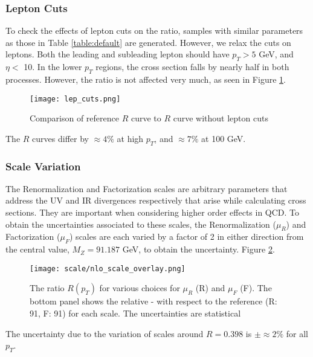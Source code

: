 \documentclass[11pt,a4paper,final]{report}
\begin{document}
\subsubsection{Lepton Cuts}
To check the effects of lepton cuts on the ratio, samples with similar parameters as those in Table \ref{table:default} are generated. However, we relax the cuts on leptons. Both the leading and subleading lepton should have $p_T > 5$ GeV, and $\eta <$ 10. In the lower $p_T$ regions, the cross section falls by nearly half in both processes. However, the ratio is not affected very much, as seen in Figure \ref{fig:lepcut}.
\begin{figure}[H]
\centering
	\texttt{[image: lep\_cuts.png]}
	\caption{Comparison of reference $R$ curve to $R$ curve without lepton cuts}
	\label{fig:lepcut}
\end{figure}
The $R$ curves differ by $\approx 4\%$ at high $p_T$, and $\approx 7\%$ at 100 GeV.

\subsubsection{Scale Variation}
The Renormalization and Factorization scales are arbitrary parameters that address the UV and IR divergences respectively that arise while calculating cross sections. They are important when considering higher order effects in QCD. To obtain the uncertainties associated to these scales, the Renormalization ($\mu_R$) and Factorization ($\mu_F$) scales are each varied by a factor of 2 in either direction from the central value, $M_Z = 91.187$ GeV, to obtain the uncertainty. Figure \ref{fig:scalecompare}.
\begin{figure}[H]
\centering
\texttt{[image: scale/nlo\_scale\_overlay.png]}
\caption{The ratio $R(p_T)$ for various choices for $\mu_R$ (R) and $\mu_F$ (F). The bottom panel shows the relative - with respect to the reference (R: 91, F: 91) for each scale. The uncertainties are statistical}
\label{fig:scalecompare}
\end{figure}
The uncertainty due to the variation of scales around $R = 0.398$ is $\pm \approx 2\%$ for all $p_T$.
\end{document}
